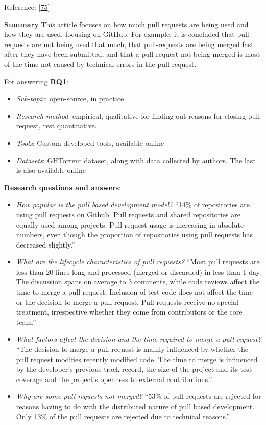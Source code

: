\documentclass[]{book}
\providecommand{\tightlist}{%
  \setlength{\itemsep}{0pt}\setlength{\parskip}{0pt}}
\begin{document}
Reference: {[}\protect\hyperlink{ref-gousios2014exploratory}{75}{]}

\textbf{Summary} This article focuses on how much pull requests are
being used and how they are used, focusing on GitHub. For example, it is
concluded that pull-requests are not being used that much, that
pull-requests are being merged fast after they have been submitted, and
that a pull request not being merged is most of the time not caused by
technical errors in the pull-request.

For answering \textbf{RQ1}:

\begin{itemize}
\tightlist
\item
  \emph{Sub-topic}: open-source, in practice
\item
  \emph{Research method}: empirical; qualitative for finding out reasons
  for closing pull request, rest quantitative.
\item
  \emph{Tools}: Custom developed tools, available online
\item
  \emph{Datasets}: GHTorrent dataset, along with data collected by
  authors. The last is also available online
\end{itemize}

\textbf{Research questions and answers}:

\begin{itemize}
\tightlist
\item
  \emph{How popular is the pull based development model?} ``14\% of
  repositories are using pull requests on Github. Pull requests and
  shared repositories are equally used among projects. Pull request
  usage is increasing in absolute numbers, even though the proportion of
  repositories using pull requests has decreased slightly.''
\item
  \emph{What are the lifecycle characteristics of pull requests?} ``Most
  pull requests are less than 20 lines long and processed (merged or
  discarded) in less than 1 day. The discussion spans on average to 3
  comments, while code reviews affect the time to merge a pull request.
  Inclusion of test code does not affect the time or the decision to
  merge a pull request. Pull requests receive no special treatment,
  irrespective whether they come from contributors or the core team.''
\item
  \emph{What factors affect the decision and the time required to merge
  a pull request?} ``The decision to merge a pull request is mainly
  influenced by whether the pull request modifies recently modified
  code. The time to merge is influenced by the developer's previous
  track record, the size of the project and its test coverage and the
  project's openness to external contributions.''
\item
  \emph{Why are some pull requests not merged?} ``53\% of pull requests
  are rejected for reasons having to do with the distributed nature of
  pull based development. Only 13\% of the pull requests are rejected
  due to technical reasons.''
\end{itemize}
\end{document}
